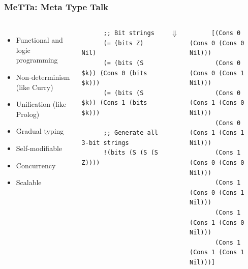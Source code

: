 \documentclass[aspectratio=169]{beamer}
\begin{document}
\begin{frame}[fragile]

  \frametitle{MeTTa: Meta Type Talk}

  \begin{columns}

    \column{7cm}
    \begin{itemize}
    \item Functional and logic programming
    \item Non-determinism (like Curry)
    \item Unification (like Prolog)
    \item Gradual typing
    \item Self-modifiable
    \item Concurrency
    \item Scalable
    \end{itemize}

    \column{7cm}

    \begin{lstlisting}
      ;; Bit strings
      (= (bits Z) Nil)
      (= (bits (S $k)) (Cons 0 (bits $k)))
      (= (bits (S $k)) (Cons 1 (bits $k)))

      ;; Generate all 3-bit strings
      !(bits (S (S (S Z))))
    \end{lstlisting}

    \begin{center}
      $\Downarrow$
    \end{center}

    \begin{lstlisting}
      [(Cons 0 (Cons 0 (Cons 0 Nil)))
       (Cons 0 (Cons 0 (Cons 1 Nil)))
       (Cons 0 (Cons 1 (Cons 0 Nil)))
       (Cons 0 (Cons 1 (Cons 1 Nil)))
       (Cons 1 (Cons 0 (Cons 0 Nil)))
       (Cons 1 (Cons 0 (Cons 1 Nil)))
       (Cons 1 (Cons 1 (Cons 0 Nil)))
       (Cons 1 (Cons 1 (Cons 1 Nil)))]
    \end{lstlisting}

  \end{columns}

\end{frame}

\end{document}
